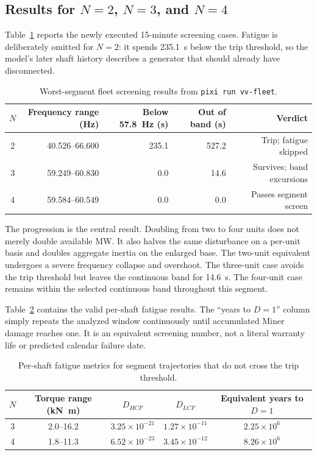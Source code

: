 \documentclass[11pt]{article}
\begin{document}
\subsection{Results for $N=2$, $N=3$, and $N=4$}

Table~\ref{tab:fleet-segment} reports the newly executed 15-minute screening
cases.  Fatigue is deliberately omitted for $N=2$: it spends
\SI{235.1}{s} below the trip threshold, so the model's later shaft history
describes a generator that should already have disconnected.

\begin{table}[htbp]
\centering
\caption{Worst-segment fleet screening results from
\texttt{pixi run vv-fleet}.}
\label{tab:fleet-segment}
\small
\begin{tabular}{@{}crrrr@{}}
\toprule
$N$ & Frequency range (Hz) & Below \SI{57.8}{Hz} (s) & Out of band (s) & Verdict \\
\midrule
2 & 40.526--66.600 & 235.1 & 527.2 & Trip; fatigue skipped \\
3 & 59.249--60.830 & 0.0 & 14.6 & Survives; band excursions \\
4 & 59.584--60.549 & 0.0 & 0.0 & Passes segment screen \\
\bottomrule
\end{tabular}
\end{table}

The progression is the central result.  Doubling from two to four units does
not merely double available MW.  It also halves the same disturbance on a
per-unit basis and doubles aggregate inertia on the enlarged base.  The
two-unit equivalent undergoes a severe frequency collapse and overshoot.  The
three-unit case avoids the trip threshold but leaves the continuous band for
\SI{14.6}{s}.  The four-unit case remains within the selected continuous band
throughout this segment.

Table~\ref{tab:fleet-fatigue} contains the valid per-shaft fatigue results.
The ``years to $D=1$'' column simply repeats the analyzed window continuously
until accumulated Miner damage reaches one.  It is an equivalent screening
number, not a literal warranty life or predicted calendar failure date.

\begin{table}[htbp]
\centering
\caption{Per-shaft fatigue metrics for segment trajectories that do not cross
the trip threshold.}
\label{tab:fleet-fatigue}
\small
\begin{tabular}{@{}ccccc@{}}
\toprule
$N$ & Torque range (\si{kN.m}) & $D_{HCF}$ & $D_{LCF}$ & Equivalent years to $D=1$ \\
\midrule
3 & 2.0--16.2 & $3.25\times10^{-21}$ & $1.27\times10^{-11}$ & $2.25\times10^6$ \\
4 & 1.8--11.3 & $6.52\times10^{-23}$ & $3.45\times10^{-12}$ & $8.26\times10^6$ \\
\bottomrule
\end{tabular}
\end{table}
\end{document}
